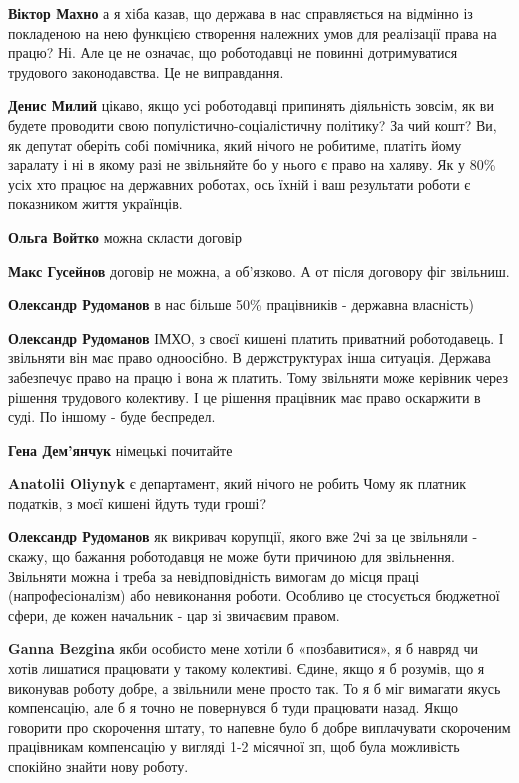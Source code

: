 \begin{itemize}
\begin{itemize}
\textbf{Віктор Махно} а я хіба казав, що держава в нас справляється на відмінно із покладеною на нею функцією створення належних умов для реалізації права на працю? Ні. Але це не означає, що роботодавці не повинні дотримуватися трудового законодавства. Це не виправдання.

\textbf{Денис Милий} цікаво, якщо усі роботодавці припинять діяльність зовсім,
як ви будете проводити свою популістично-соціалістичну політику? За чий кошт?
Ви, як депутат оберіть собі помічника, який нічого не робитиме, платіть йому
заралату і ні в якому разі не звільняйте бо у нього є право на халяву. Як у 80\%
усіх хто працює на державних роботах, ось їхній і ваш результати роботи є
показником життя українців.

\textbf{Ольга Войтко} можна скласти договір

\textbf{Макс Гусейнов} договір не можна, а об'язково. А от після договору фіг звільниш.

\textbf{Олександр Рудоманов} в нас більше 50\% працівників - державна власність)

\textbf{Олександр Рудоманов} ІМХО, з своєї кишені платить приватний роботодавець. І звільняти він має право одноосібно.
В держструктурах інша ситуація. Держава забезпечує право на працю і вона ж платить. Тому звільняти може керівник через рішення трудового колективу. І це рішення працівник має право оскаржити в суді.
По іншому - буде беспредел.

\textbf{Гена Дем'янчук} німецькі почитайте


\textbf{Anatolii Oliynyk} є департамент, який нічого не робить
Чому як платник податків, з моєї кишені йдуть туди гроші?

\textbf{Олександр Рудоманов} як викривач корупції, якого вже 2чі за це звільняли - скажу, що бажання роботодавця не може бути причиною для звільнення. Звільняти можна і треба за невідповідність вимогам до місця праці (напрофесіоналізм) або невиконання роботи. Особливо це стосується бюджетної сфери, де кожен начальник - цар зі звичаєвим правом.

\textbf{Ganna Bezgina} якби особисто мене хотіли б «позбавитися», я б навряд чи хотів лишатися працювати у такому колективі. Єдине, якщо я б розумів, що я виконував роботу добре, а звільнили мене просто так. То я б міг вимагати якусь компенсацію, але б я точно не повернувся б туди працювати назад.
Якщо говорити про скорочення штату, то напевне було б добре виплачувати скороченим працівникам компенсацію у вигляді 1-2 місячної зп, щоб була можливість спокійно знайти нову роботу.


\end{itemize}
\end{itemize}
